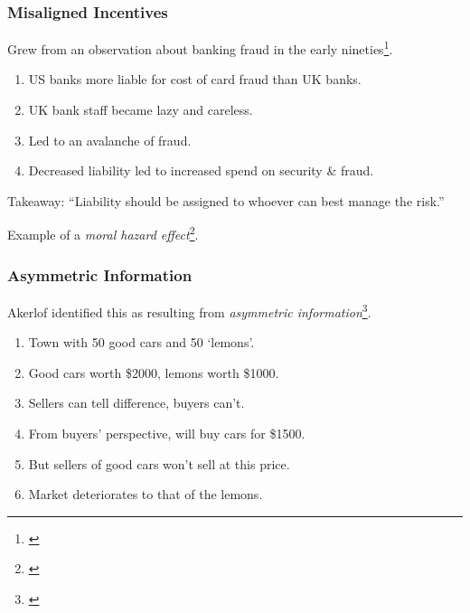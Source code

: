 \documentclass[handout, notes=hide]{beamer}
\newcommand{\prescite}[1]{\footnote{\cite{#1}}}
\begin{document}
\begin{frame}
\frametitle{Misaligned Incentives}
\setlength{\parskip}{0.5em}

Grew from an observation about banking fraud in the early nineties\prescite{anderson1994}.

\begin{enumerate}
\item US banks more liable for cost of card fraud than UK banks.
\item UK bank staff became lazy and careless.
\item Led to an avalanche of fraud.
\item Decreased liability led to increased spend on security \& fraud.
\end{enumerate}
Takeaway: ``Liability should be assigned to whoever can best manage the risk.''

Example of a {\it moral hazard effect}\prescite{dembe2000}.

\end{frame}

\begin{frame}
\frametitle{Asymmetric Information}

Akerlof identified this as resulting from {\it asymmetric information}\prescite{akerlof1970}.

\begin{enumerate}
\item Town with 50 good cars and 50 `lemons'.
\item Good cars worth \$2000, lemons worth \$1000.
\item Sellers can tell difference, buyers can't.
\item From buyers' perspective, will buy cars for \$1500.
\item But sellers of good cars won't sell at this price.
\item Market deteriorates to that of the lemons.
\end{enumerate}

\end{frame}
\end{document}
